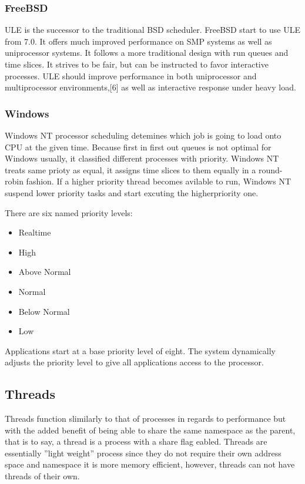 \documentclass[10pt,draftclsnofoot,onecolumn,journal,compsoc]{IEEEtran}
\newcommand{\tab}{\hspace*{2em}} %
\begin{document}
\subsubsection*{FreeBSD}
\tab ULE is the successor to the traditional BSD scheduler. FreeBSD start to use ULE from 7.0.  It offers much improved performance on SMP systems as well as uniprocessor systems. It follows a more traditional design with run queues and time slices. It strives to be fair, but can be instructed to favor interactive processes. ULE should improve performance in both uniprocessor and multiprocessor environments,[6] as well as interactive response under heavy load.\cite{freebsd.org}

\subsubsection*{Windows}
\tab Windows NT processor scheduling detemines which job is going to load onto
CPU at the given time. Because first in first out queues is not optimal for
Windows usually, it classified different processes with priority. Windows NT
treats same prioty as equal, it assigns time slices to them equally in a
round-robin fashion. If a higher priority thread becomes avilable to run,
Windows NT suspend lower priority tasks and start excuting the higherpriority
one\cite{MSDN}.

There are six named priority levels:
\begin{itemize}
    \item Realtime
    \item High
    \item Above Normal
    \item Normal
    \item Below Normal
    \item Low
\end{itemize}
\tab Applications start at a base priority level of eight. The system dynamically
adjusts the priority level to give all applications access to the processor.

\subsection{Threads}
Threads function slimilarly to that of processes in regards to performance but with the added benefit of being able to share the same namespace as the parent, that is to say, a thread is a process with a share flag eabled. Threads are essentially ''light weight'' process since they do not require their own address space and namespace it is more memory efficient, however, threads can not have threads of their own. 
\end{document}
